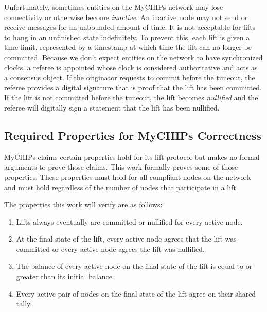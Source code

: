 \documentclass[runningheads]{llncs}
\begin{document}
Unfortunately, sometimes entities on the MyCHIPs network may lose connectivity or otherwise become \emph{inactive}. An inactive node may not send or receive messages for an unbounded amount of time. It is not acceptable for lifts to hang in an unfinished state indefinitely. To prevent this, each lift is given a time limit, represented by a timestamp at which time the lift can no longer be committed. Because we don't expect entities on the network to have synchronized clocks, a referee is appointed whose clock is considered authoritative and acts as a consensus object. If the originator requests to commit before the timeout, the referee provides a digital signature that is proof that the lift has been committed. If the lift is not committed before the timeout, the lift becomes \emph{nullified} and the referee will digitally sign a statement that the lift has been nullified.

\subsection{Required Properties for MyCHIPs Correctness}\label{sec:requiredProperties}

MyCHIPs claims certain properties hold for its lift protocol but makes no formal arguments to prove those claims. This work formally proves some of those properties. These properties must hold for all compliant nodes on the network and must hold regardless of the number of nodes that participate in a lift. 

The properties this work will verify are as follows:

\begin{enumerate}
\item Lifts always eventually are committed or nullified for every active node. 
\item At the final state of the lift, every active node agrees that the lift was committed or every active node agrees the lift was nullified. 
\item The balance of every active node on the final state of the lift is equal to or greater than its initial balance.
\item Every active pair of nodes on the final state of the lift agree on their shared tally.
\end{enumerate}
\end{document}
